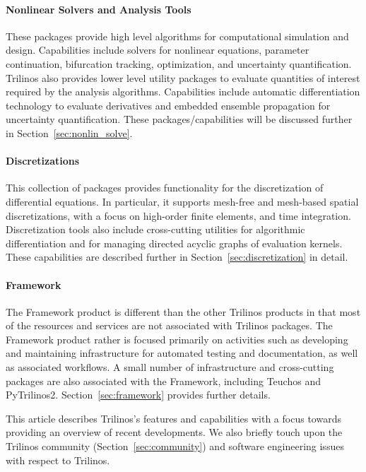 \paragraph{Nonlinear Solvers and Analysis Tools} These packages provide high level algorithms for computational simulation and design. Capabilities include solvers for nonlinear equations, parameter continuation, bifurcation tracking, optimization, and uncertainty quantification. Trilinos also provides lower level utility packages to evaluate quantities of interest required by the analysis algorithms. Capabilities include automatic differentiation technology to evaluate derivatives and embedded ensemble propagation for uncertainty quantification. These packages/capabilities will be discussed further in Section~\ref{sec:nonlin_solve}.

\paragraph{Discretizations} This collection of packages provides functionality for the discretization of differential equations. In particular, it supports mesh-free and mesh-based spatial discretizations, with a focus on high-order finite elements, and time integration. Discretization tools also include cross-cutting utilities for algorithmic differentiation and for managing directed acyclic graphs of evaluation kernels. These capabilities are described further in Section~\ref{sec:discretization} in detail.

\paragraph{Framework} The Framework product is different than the other Trilinos products in that most of the resources and services are not associated with Trilinos packages. The Framework product rather is focused primarily on activities such as developing and maintaining infrastructure for automated testing and documentation, as well as associated workflows. A small number of infrastructure and cross-cutting packages are also associated with the Framework, including Teuchos and PyTrilinos2. Section~\ref{sec:framework} provides further details.


\vspace{2.0ex} This article describes Trilinos's features and capabilities with a focus towards providing an overview of recent developments. We also briefly touch upon the Trilinos community (Section~\ref{sec:community}) and software engineering issues with respect to Trilinos.
